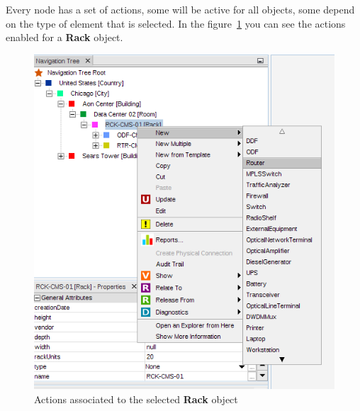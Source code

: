 \documentclass[a4paper]{article}
\begin{document}
	Every node has a set of actions, some will be active for all objects, some depend on the type of element that is selected. In the figure~\ref{fig:navigation_tree_context_menu} you can see the actions enabled for a \textbf{Rack} object. \\
	\begin{figure}[h!]
		\centering
		\includegraphics[width=0.7\linewidth]{img/navigation_tree_context_menu.png}
		\caption{Actions associated to the selected \textbf{Rack} object}
		\label{fig:navigation_tree_context_menu}
	\end{figure}
\end{document}
